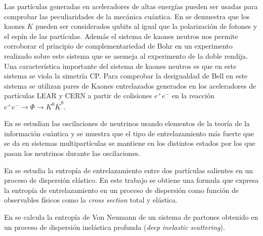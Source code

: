 \documentclass{article}
\theoremstyle{plain}
\theoremstyle{definition}
\begin{document}
	Las partículas generadas en aceleradores de altas energías pueden ser usadas para comprobar las peculiaridades de la mecánica cuántica. En \cite{Bertlmann:2005nm} se demuestra que los kaones \(K\) pueden ser considerados qubits al igual que la polarización de fotones y el espín de las partículas. Además el sistema de kaones neutros nos permite corroborar el principio de complementariedad de Bohr en un experimento realizado sobre este sistema que se asemeja al experimento de la doble rendija. Una característica importante del sistema de kaones neutros es que en este sistema se viola la simetría CP. Para comprobar la desigualdad de Bell en este sistema se utilizan pares de Kaones entrelazados generados en los aceleradores de partículas LEAR y CERN a partir de colisiones \(e^+e^-\) en la reacción \(e^+e^- \rightarrow \Phi \rightarrow K^0\overline{K}^0\).\par En \cite{Banerjee:2015mha} se estudian las oscilaciones de neutrinos usando elementos de la teoría de la información cuántica y se muestra que el tipo de entrelazamiento más fuerte que se da en sistemas multipartículas se mantiene en los distintos estados por los que pasan los neutrinos durante las oscilaciones. \par En \cite{Peschanski:2016hgk} se estudia la entropía de entrelazamiento entre dos partículas salientes en un proceso de dispersión elástico. En este trabajo se obtiene una formula que expresa la entropía de entrelazamiento en un proceso de dispersión como función de observables físicos como la \textit{cross section} total y elástica. \par En \cite{Kharzeev:2017qzs} se calcula la entropía de Von Neumann de un sistema de partones obtenido en un proceso de dispersión inelástica profunda (\textit{deep inelastic scattering}).\par 
\end{document}
